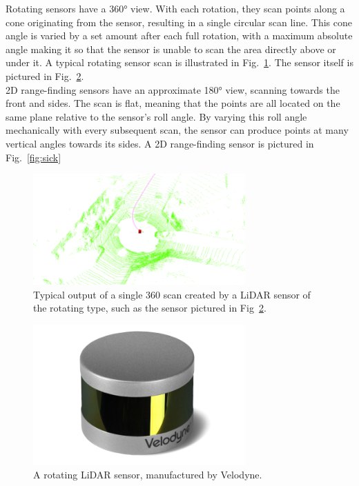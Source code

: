 Rotating sensors have a 360° view. With each rotation, they scan points along a cone originating from the sensor, resulting in a single circular scan line. This cone angle is varied by a set amount after each full rotation, with a maximum absolute angle making it so that the sensor is unable to scan the area directly above or under it. A typical rotating sensor scan is illustrated in Fig.~\ref{fig:velodyne-scan}. The sensor itself is pictured in Fig.~\ref{fig:velodyne}.\\

2D range-finding sensors have an approximate 180° view, scanning towards the front and sides. The scan is flat, meaning that the points are all located on the same plane relative to the sensor’s roll angle. By varying this roll angle mechanically with every subsequent scan, the sensor can produce points at many vertical angles towards its sides. A 2D range-finding sensor is pictured in Fig.~\ref{fig:sick}\\

\begin{figure}
  \centering
  \includegraphics[width=3.2in]{images/1_velodyne_scan.png}
  \caption{Typical output of a single 360 \degree scan created by a LiDAR sensor of the rotating type, such as the sensor pictured in Fig~\ref{fig:velodyne}.}
  \label{fig:velodyne-scan}
\end{figure}

\begin{figure}
  \centering
  \includegraphics[width=3.2in]{images/Velodyne.png}
  \caption{A rotating LiDAR sensor, manufactured by Velodyne.}
  \label{fig:velodyne}
\end{figure}

